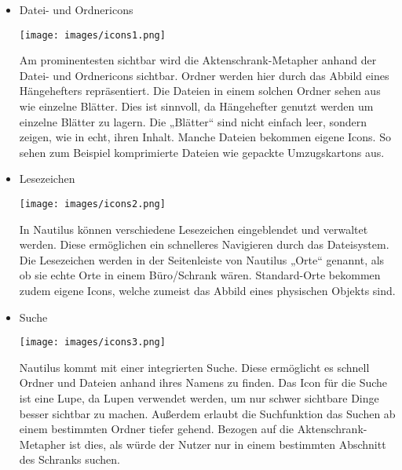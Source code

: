 \documentclass[a4paper,10pt]{article}
\begin{document}
\begin{itemize}
\item Datei- und Ordnericons

\texttt{[image: images/icons1.png]}

Am prominentesten sichtbar wird die Aktenschrank-Metapher anhand der Datei- und Ordnericons sichtbar. Ordner werden hier durch das Abbild eines Hängehefters repräsentiert. Die Dateien in einem solchen Ordner sehen aus wie einzelne Blätter. Dies ist sinnvoll, da Hängehefter genutzt werden um einzelne Blätter zu lagern. Die „Blätter“ sind nicht einfach leer, sondern zeigen, wie in echt, ihren Inhalt. Manche Dateien bekommen eigene Icons. So sehen zum Beispiel komprimierte Dateien wie gepackte Umzugskartons aus.


\item Lesezeichen

\texttt{[image: images/icons2.png]}

In Nautilus können verschiedene Lesezeichen eingeblendet und verwaltet werden. Diese ermöglichen ein schnelleres Navigieren durch das Dateisystem. Die Lesezeichen werden in der Seitenleiste von Nautilus „Orte“ genannt, als ob sie echte Orte in einem Büro/Schrank wären. Standard-Orte bekommen zudem eigene Icons, welche zumeist das Abbild eines physischen Objekts sind.


\item Suche

\texttt{[image: images/icons3.png]}

Nautilus kommt mit einer integrierten Suche. Diese ermöglicht es schnell Ordner und Dateien anhand ihres Namens zu finden. Das Icon für die Suche ist eine Lupe, da Lupen verwendet werden, um nur schwer sichtbare Dinge besser sichtbar zu machen. Außerdem erlaubt die Suchfunktion das Suchen ab einem bestimmten Ordner tiefer gehend. Bezogen auf die Aktenschrank-Metapher ist dies, als würde der Nutzer nur in einem bestimmten Abschnitt des Schranks suchen.

\end{itemize}
\end{document}
